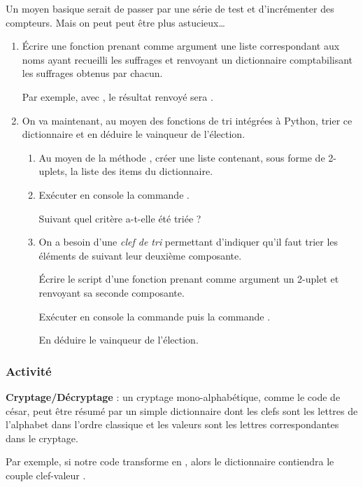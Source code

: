 \documentclass[11pt,a4paper,french,twoside]{PMCours}
\newcounter{activite}
\newcommand{\activite}{\subsubsection*{Activité~\refstepcounter{activite}\theactivite}}
\begin{document}
Un moyen basique serait de passer par une série de test et d'incrémenter 
des compteurs. Mais on peut peut être plus astucieux\dots

\begin{enumerate}
\item Écrire une fonction  prenant comme argument 
une liste  correspondant aux noms ayant recueilli les suffrages 
et renvoyant un dictionnaire comptabilisant les suffrages obtenus par chacun.

Par exemple, avec , 
le résultat renvoyé sera .

\item On va maintenant, au moyen des fonctions de tri intégrées à Python, 
trier ce dictionnaire et en déduire le vainqueur de l'élection.
\begin{enumerate}
\item Au moyen de la méthode , 
créer une liste  contenant, sous forme de 2-uplets, 
la liste des items du dictionnaire.
\item Exécuter en console la commande . 

Suivant quel critère  a-t-elle été triée ?
\item On a besoin d'une {\em clef de tri} permettant d'indiquer qu'il faut trier
les éléments de  suivant leur deuxième composante.

Écrire le script d'une fonction  prenant comme argument 
un 2-uplet  et renvoyant sa seconde composante.

Exécuter en console la commande  
puis la commande . 

En déduire le vainqueur de l'élection.

\end{enumerate}
\end{enumerate}

\activite 
\textbf{Cryptage/Décryptage} : 
un cryptage mono-alphabétique, comme le code de césar, 
peut être résumé par un simple dictionnaire 
dont les clefs sont les lettres de l'alphabet dans l'ordre classique 
et les valeurs sont les lettres correspondantes dans le cryptage.

Par exemple, si notre code transforme  en , 
alors le dictionnaire contiendra le couple clef-valeur .
\end{document}

